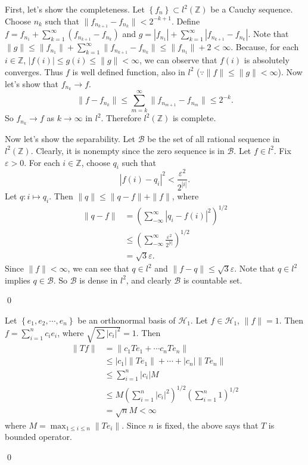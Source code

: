 \begin{exercise}[4.4] \hfill
	
	First, let's show the completeness.
	Let $\left\{ f_n \right\} \subset l^2(\mathbb{Z})$ be a Cauchy sequence.
	Choose $n_k$ such that $\| f_{n_{k+1}} - f_{n_k} \| < 2^{-k+1}$.
	Define $f = f_{n_1} + \sum_{k=1}^\infty (f_{n_{k+1}} - f_{n_k})$
	and $g = |f_{n_1}| + \sum_{k=1}^\infty |f_{n_{k+1}} - f_{n_k}|$.
	Note that $\| g \| \le \| f_{n_1} \| + \sum_{k=1}^\infty \| f_{n_{k+1}} - f_{n_k}\| \le \| f_{n_1} \| + 2 < \infty$.
	Because, for each $i \in \mathbb{Z}$, $|f(i)| \le g(i) \le \|g \| <\infty$,
	we can observe that $f(i)$ is absolutely converges.
	Thus $f$ is well defined function, also in $l^2$ ($\because \| f\| \le \|g \| < \infty$).
	Now let's show that $f_{n_k} \rightarrow f$.
	\[
		\| f - f_{n_k} \| \le \sum_{m=k}^{\infty} \| f_{n_{m+1}} - f_{n_m}\| \le 2^{-k}.
	\]
	So $f_{n_k} \rightarrow f$ as $k \rightarrow \infty$ in $l^2$.
	Therefore $l^2(\mathbb{Z})$ is complete.

	Now let's show the separability.
	Let $\mathcal{B}$ be the set of all rational sequence in $l^2(\mathbb{Z})$.
	Clearly, it is nonempty since the zero sequence is in $\mathcal{B}$.
	Let $f \in l^2$.
	Fix $\varepsilon >0$.
	For each $i\in \mathbb{Z}$, choose $q_i$ such that 
	\[
		|f(i) - q_i|^2 < \frac{\varepsilon^2}{2^{|i|}}.
	\]
	Let $q: i \mapsto q_i$.
	Then $\| q \| \le \| q - f\| + \| f \|$,
	where
	\[
		\begin{split}
			\| q - f \|
			&= \left (\sum_{-\infty}^\infty |q_i - f(i)|^2 \right )^{1/2} \\
			&\le \left( \sum_{-\infty}^\infty \frac{\varepsilon^2}{2^{|i|}} \right)^{1/2} \\
			&= \sqrt{3} \varepsilon.
		\end{split}
	\]
	Since $\|f \| <\infty$, we can see that $q \in l^2$ and $\| f-q\| \le \sqrt{3} \varepsilon$.
	Note that $q \in l^2$ implies $q \in \mathcal{B}$.
	So $\mathcal{B}$ is dense in $l^2$, and clearly $\mathcal{B}$ is countable set.

	\qed
\end{exercise}

\begin{exercise}[4.15] \hfill

	Let $\left\{ e_1, e_2, \cdots, e_n \right\}$ be an orthonormal basis of $\mathcal{H}_1$.
	Let $f \in \mathcal{H}_1$, $\| f\| = 1$.
	Then $f = \sum_{i=1}^n c_i e_i$, where $\sqrt{\sum |c_i|^2} = 1$.
	Then
	\[
		\begin{split}
			\| Tf\|
			&= \| c_1 Te_1 + \cdots c_n Te_n \| \\
			&\le |c_1|\|Te_1\| + \cdots + |c_n| \|Te_n\| \\
			&\le \sum_{i=1}^n|c_i|M \\
			&\le M \left( \sum_{i=1}^n |c_i|^2 \right)^{1/2}\left( \sum_{i=1}^n 1 \right)^{1/2}\\
			&= \sqrt{n} M < \infty
		\end{split}
	\]
	where $M = \max_{1 \le i \le n} \| Te_i \|$.
	Since $n$ is fixed, the above says that $T$ is bounded operator.

	\qed
\end{exercise}

